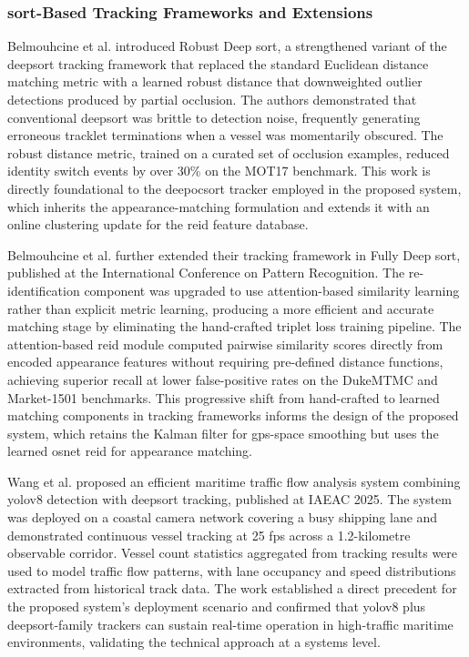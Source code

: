 \subsubsection{\textbf{\gls{sort}-Based Tracking Frameworks and Extensions}}
Belmouhcine et al. \cite{Belmouhcine2021} introduced Robust Deep \gls{sort}, a
strengthened variant of the \gls{deepsort} tracking framework that replaced the standard
Euclidean distance matching metric with a learned robust distance that downweighted
outlier detections produced by partial occlusion. The authors demonstrated that
conventional \gls{deepsort} was brittle to detection noise, frequently generating
erroneous tracklet terminations when a vessel was momentarily obscured. The robust
distance metric, trained on a curated set of occlusion examples, reduced identity
switch events by over 30\% on the MOT17 benchmark. This work is directly
foundational to the \gls{deepocsort} tracker employed in the proposed system, which
inherits the appearance-matching formulation and extends it with an online
clustering update for the \gls{reid} feature database.
 
Belmouhcine et al. \cite{Belmouhcine2022} further extended their tracking
framework in Fully Deep \gls{sort}, published at the International Conference on Pattern
Recognition. The re-identification component was upgraded to use attention-based
similarity learning rather than explicit metric learning, producing a more efficient
and accurate matching stage by eliminating the hand-crafted triplet loss training
pipeline. The attention-based \gls{reid} module computed pairwise similarity scores
directly from encoded appearance features without requiring pre-defined distance
functions, achieving superior recall at lower false-positive rates on the DukeMTMC
and Market-1501 benchmarks. This progressive shift from hand-crafted to learned
matching components in tracking frameworks informs the design of the proposed
system, which retains the Kalman filter for \gls{gps}-space smoothing but uses the
learned \gls{osnet} \gls{reid} for appearance matching.
 
Wang et al. \cite{Wang2025a} proposed an efficient maritime traffic flow analysis
system combining \gls{yolov8} detection with \gls{deepsort} tracking, published at IAEAC 2025.
The system was deployed on a coastal camera network covering a busy shipping lane
and demonstrated continuous vessel tracking at 25 fps across a 1.2-kilometre
observable corridor. Vessel count statistics aggregated from tracking results were
used to model traffic flow patterns, with lane occupancy and speed distributions
extracted from historical track data. The work established a direct precedent for
the proposed system's deployment scenario and confirmed that \gls{yolov8} plus
\gls{deepsort}-family trackers can sustain real-time operation in high-traffic maritime
environments, validating the technical approach at a systems level.
 

